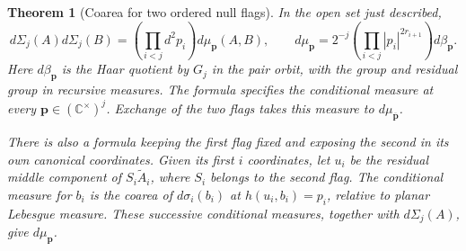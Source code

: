 \documentclass[a4paper,11pt]{article}
\newtheorem{theorem}[proposition]{Theorem}
\theoremstyle{definition}
\theoremstyle{remark}
\numberwithin{equation}{section}
\begin{document}
\begin{theorem}[Coarea for two ordered null flags]
\leavevmode\label{thm:flagmeasure922}
In the open set just described,
\[
 d\Sigma_j(A)d\Sigma_j(B)=
 \left(\prod_{i<j}d^2p_i\right)d\mu_{\mathbf p}(A,B),\qquad
 d\mu_{\mathbf p}=2^{-j}
       \left(\prod_{i<j}|p_i|^{2r_{i+1}}\right)d\beta_{\mathbf p}.
\]
Here \(d\beta_{\mathbf p}\) is the Haar quotient by \(G_j\) in
the pair orbit, with the group and residual group in recursive
measures. The formula specifies the conditional measure at
every \(\mathbf p\in(\mathbb C^\times)^j\). Exchange of the
two flags takes this measure to \(d\mu_{\overline{\mathbf p}}\).

There is also a formula keeping the first flag fixed and exposing
the second in its own canonical coordinates. Given its first
\(i\) coordinates, let \(u_i\) be the residual middle component
of \(S_i\widetilde A_i\), where \(S_i\) belongs to the second
flag. The conditional measure for \(b_i\) is the coarea of
\(d\sigma_i(b_i)\) at \(h(u_i,b_i)=p_i\), relative to planar
Lebesgue measure. These successive conditional measures, together
with \(d\Sigma_j(A)\), give \(d\mu_{\mathbf p}\).
\end{theorem}
\end{document}
